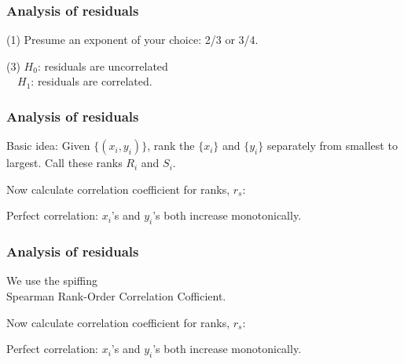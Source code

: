\begin{frame}
  \frametitle{Analysis of residuals}

(1) Presume an exponent of your choice: 2/3 or 3/4.



(3) $H_0$: residuals are uncorrelated\\
\ \ \quad $H_1$: residuals are correlated.



\inv

\vis

\end{frame}

\begin{frame}
  \frametitle{Analysis of residuals}


\inv 

Basic idea:  Given $\{(x_i,y_i)\}$, rank 
the $\{x_i\}$ and $\{y_i\}$ separately from
smallest to largest.  Call these ranks $R_i$ and $S_i$.

Now calculate correlation coefficient for ranks, $r_s$:

{\small
{}
}

Perfect correlation: $x_i$'s and $y_i$'s both
increase monotonically.

\vis


\end{frame}

\begin{frame}
  \frametitle{Analysis of residuals}

We use the spiffing \\
Spearman Rank-Order Correlation Cofficient.


\inv 

Now calculate correlation coefficient for ranks, $r_s$:

{\small
{}
}

Perfect correlation: $x_i$'s and $y_i$'s both
increase monotonically.

\vis


\end{frame}

